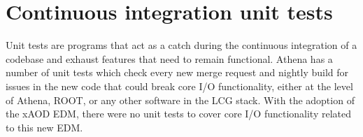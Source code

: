 \section{Continuous integration unit tests}
Unit tests are programs that act as a catch during the continuous integration of a codebase and exhaust features that need to remain functional. 
Athena has a number of unit tests which check every new merge request and nightly build for issues in the new code that could break core I/O functionality, either at the level of Athena, ROOT, or any other software in the LCG stack.
With the adoption of the xAOD EDM, there were no unit tests to cover core I/O functionality related to this new EDM. 

